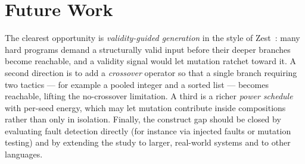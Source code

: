 \documentclass[11pt,a4paper]{report}
\begin{document}
\section{Future Work}

The clearest opportunity is \emph{validity-guided generation} in the style of Zest~\cite{padhye2019zest}: many
hard programs demand a structurally valid input before their deeper branches become reachable, and a validity
signal would let mutation ratchet toward it. A second direction is to add a \emph{crossover}
operator so that a single branch requiring two tactics — for example a pooled integer and a sorted list —
becomes reachable, lifting the no-crossover limitation. A third is a richer \emph{power schedule} with per-seed energy,
which may let mutation contribute inside compositions rather than only in isolation. Finally, the construct
gap should be closed by evaluating fault detection directly (for instance via injected faults or mutation
testing) and by extending the study to larger, real-world systems and to other languages.
\end{document}
